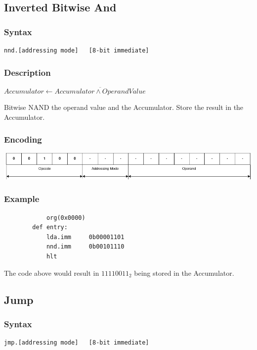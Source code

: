\pagebreak
\subsection{Inverted Bitwise And}\label{subsec:nand}
    \subsubsection{Syntax}
    \begin{verbatim}nnd.[addressing mode]   [8-bit immediate] \end{verbatim}

    \subsubsection{Description}
    $Accumulator \leftarrow \overline{Accumulator \land OperandValue}$
    \par Bitwise NAND the operand value and the Accumulator.
    Store the result in the Accumulator.

    \subsubsection{Encoding}
    \begin{center}
        \includegraphics[scale=0.40]{img/Andromeda-NND.drawio}
    \end{center}


    \subsubsection{Example}
    \begin{verbatim}
            org(0x0000)
        def entry:
            lda.imm     0b00001101
            nnd.imm     0b00101110
            hlt
    \end{verbatim}
    \par The code above would result in $11110011_{2}$ being stored in the Accumulator.

\pagebreak
\subsection{Jump}\label{subsec:jmp}
    \subsubsection{Syntax}
    \begin{verbatim}jmp.[addressing mode]   [8-bit immediate]\end{verbatim}
